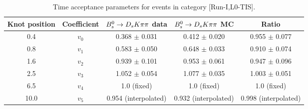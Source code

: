 \begin{table}[hp!]
\centering
\small
\caption{Time acceptance parameters for events in category [\textsf{Run-I},\textsf{L0-TIS}].}
\begin{tabular}{c c c c c}
\hline
\hline
Knot position & Coefficient & ${{B}^0_{s}}\rightarrow{\ensuremath{{D}_{s}}}{\ensuremath{K}}{\ensuremath{\pi}}{\ensuremath{\pi}}$ data & ${{B}^0_{s}}\rightarrow{\ensuremath{{D}_{s}}}{\ensuremath{K}}{\ensuremath{\pi}}{\ensuremath{\pi}}$ MC & Ratio \\
\hline
0.4 & $v_{0}$ & 0.368 $\pm$ 0.031 & 0.412 $\pm$ 0.020 & 0.955 $\pm$ 0.077\\
0.8 & $v_{1}$ & 0.583 $\pm$ 0.050 & 0.648 $\pm$ 0.033 & 0.910 $\pm$ 0.074\\
1.6 & $v_{2}$ & 0.939 $\pm$ 0.101 & 0.953 $\pm$ 0.061 & 0.947 $\pm$ 0.096\\
2.5 & $v_{3}$ & 1.052 $\pm$ 0.054 & 1.077 $\pm$ 0.035 & 1.003 $\pm$ 0.051\\
6.5 & $v_{4}$ &  1.0 (fixed) & 1.0 (fixed) & 1.0 (fixed)\\
10.0 & $v_{5}$ & 0.954 (interpolated) & 0.932 (interpolated) & 0.998 (interpolated) \\
\hline
\hline
\end{tabular}
\label{table:splines}
\end{table}
